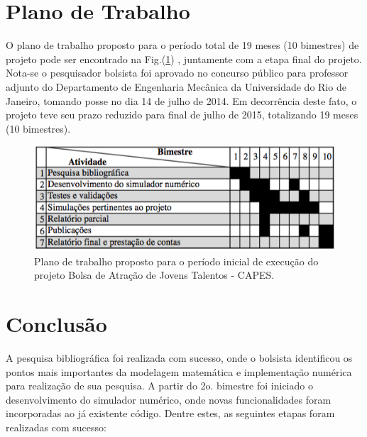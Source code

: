 \documentclass[a4paper,portuges,12pt]{article}
\begin{document}
\section{Plano de Trabalho}

O plano de trabalho proposto para o período total de 19 meses (10
bimestres) de projeto pode ser encontrado na Fig.(\ref{fig:plano}) ,
juntamente com a etapa final do projeto. Nota-se o pesquisador bolsista
foi aprovado no concurso público para professor adjunto do Departamento
de Engenharia Mecânica da Universidade do Rio de Janeiro, tomando posse
no dia 14 de julho de 2014. Em decorrência deste fato, o projeto teve
seu prazo reduzido para final de julho de 2015, totalizando 19 meses (10
bimestres). 

 \begin{figure}[ht!]
 	\begin{center}
 		\includegraphics[angle=0, scale=0.75]{figs/plano.png}
 	\end{center}
 	\caption{Plano de trabalho proposto para o período inicial de
	execução do projeto Bolsa de Atração de Jovens Talentos - CAPES.}
 	\label{fig:plano} 
 \end{figure}


\section{Conclusão}

A pesquisa bibliográfica foi realizada com sucesso, onde o bolsista
identificou os pontos mais importantes da modelagem matemática e
implementação numérica para realização de sua pesquisa. A partir do 2o.
bimestre foi iniciado o desenvolvimento do simulador numérico, onde
novas funcionalidades foram incorporadas ao já existente código. Dentre
estes, as seguintes etapas foram realizadas com sucesso:
\end{document}
